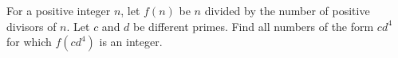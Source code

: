 For a positive integer $n$, let $f(n)$ be $n$ divided by the number of positive divisors of $n$. Let $c$ and $d$ be different primes. Find all numbers of the form $cd^4$ for which $f\left(cd^4\right)$ is an integer.
